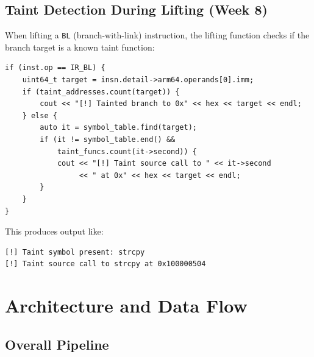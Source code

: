 \documentclass[12pt,a4paper]{article}
\begin{document}
\subsection{Taint Detection During Lifting (Week 8)}

When lifting a \texttt{BL} (branch-with-link) instruction, the lifting function checks if the branch target is a known taint function:

\begin{lstlisting}
if (inst.op == IR_BL) {
    uint64_t target = insn.detail->arm64.operands[0].imm;
    if (taint_addresses.count(target)) {
        cout << "[!] Tainted branch to 0x" << hex << target << endl;
    } else {
        auto it = symbol_table.find(target);
        if (it != symbol_table.end() && 
            taint_funcs.count(it->second)) {
            cout << "[!] Taint source call to " << it->second
                 << " at 0x" << hex << target << endl;
        }
    }
}
\end{lstlisting}

This produces output like:
\begin{verbatim}
[!] Taint symbol present: strcpy
[!] Taint source call to strcpy at 0x100000504
\end{verbatim}

\newpage

\section{Architecture and Data Flow}

\subsection{Overall Pipeline}

\begin{center}
\end{center}
\end{document}
